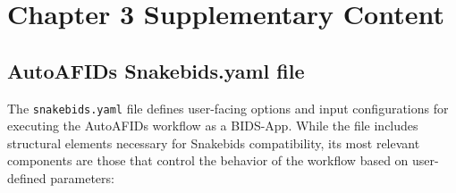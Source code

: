 \chapter{Chapter 3 Supplementary Content}\label{app:ch3suppcontent}
\newpage

\section{AutoAFIDs Snakebids.yaml file}
The \texttt{snakebids.yaml} file defines user-facing options and input configurations for executing the AutoAFIDs workflow as a BIDS-App. While the file includes structural elements necessary for Snakebids compatibility, its most relevant components are those that control the behavior of the workflow based on user-defined parameters:
